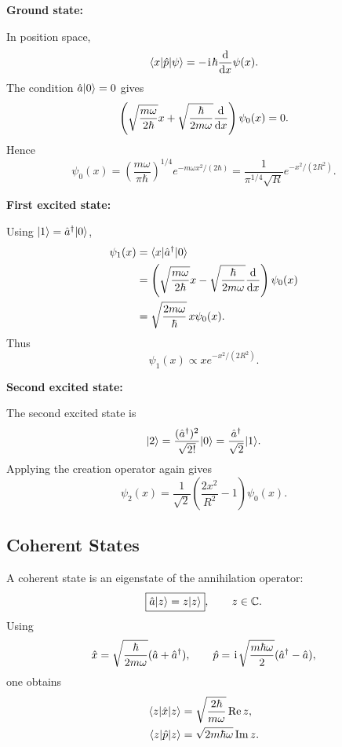 \textbf{Ground state:}

In position space,
\begin{equation}
 \langle{x}|\hat p|{\psi}\rangle
 =-\hspace{1pt}\mathrm{i}\hspace{1pt}\hbar\frac{\mathrm{d}{}}{\mathrm{d} x}\psi(x).
\end{equation}
The condition $\hat a|{0}\rangle=0$ gives
\begin{equation}
 \left(\sqrt{\frac{m\omega}{2\hbar}}x
 +\sqrt{\frac{\hbar}{2m\omega}}\frac{\mathrm{d}{}}{\mathrm{d} x}\right)
 \psi_0(x)=0.
\end{equation}
Hence
\begin{equation}
 \boxed{
 \psi_0(x)=\left(\frac{m\omega}{\pi\hbar}\right)^{1/4}
 e^{-m\omega x^2/(2\hbar)}
 =\frac{1}{\pi^{1/4}\sqrt R}e^{-x^2/(2R^2)}.}
\end{equation}

\textbf{First excited state:}

Using $|{1}\rangle=\hat a^\dagger|{0}\rangle$,
\begin{align}
 \psi_1(x)
 &=\langle{x}|\hat a^\dagger|{0}\rangle\\
 &=\left(\sqrt{\frac{m\omega}{2\hbar}}x
 -\sqrt{\frac{\hbar}{2m\omega}}\frac{\mathrm{d}{}}{\mathrm{d} x}\right)
 \psi_0(x)\\
 &=\sqrt{\frac{2m\omega}{\hbar}}\,x\psi_0(x).
\end{align}
Thus
\begin{equation}
 \psi_1(x)\propto xe^{-x^2/(2R^2)}.
\end{equation}

\textbf{Second excited state:}

The second excited state is
\begin{equation}
 |{2}\rangle=\frac{(\hat a^\dagger)^2}{\sqrt{2!}}|{0}\rangle
 =\frac{\hat a^\dagger}{\sqrt2}|{1}\rangle.
\end{equation}
Applying the creation operator again gives
\begin{equation}
 \boxed{
 \psi_2(x)=\frac{1}{\sqrt2}
 \left(\frac{2x^2}{R^2}-1\right)\psi_0(x).}
\end{equation}


\subsection{Coherent States}

A coherent state is an eigenstate of the annihilation operator:
\begin{equation}
\boxed{\hat a|{z}\rangle=z|{z}\rangle},
\qquad z\in\mathbb C.
\end{equation}
Using
\begin{equation}
\hat x=\sqrt{\frac{\hbar}{2m\omega}}(\hat a+\hat a^\dagger),
\qquad
\hat p=\hspace{1pt}\mathrm{i}\hspace{1pt}\sqrt{\frac{m\hbar\omega}{2}}(\hat a^\dagger-\hat a),
\end{equation}
one obtains
\begin{align}
\langle{z}|\hat x|{z}\rangle
&=\sqrt{\frac{2\hbar}{m\omega}}\operatorname{Re} z,\\
\langle{z}|\hat p|{z}\rangle
&=\sqrt{2m\hbar\omega}\operatorname{Im} z.
\end{align}

